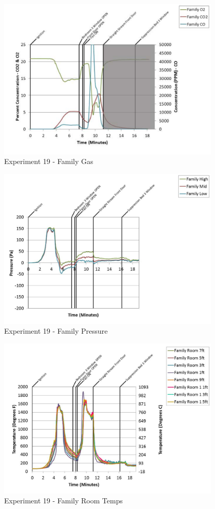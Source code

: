 \documentclass{article}
\begin{document}
\begin{appendices}
	\clearpage

	\begin{figure}[h!]
		\centering
		\includegraphics[height=3.05in]{0_Images/Results_Charts/Exp_19_Charts/FamilyGas.pdf}
		\caption{Experiment 19 - Family Gas}
	\end{figure}
 

	\begin{figure}[h!]
		\centering
		\includegraphics[height=3.05in]{0_Images/Results_Charts/Exp_19_Charts/FamilyPressure.pdf}
		\caption{Experiment 19 - Family Pressure}
	\end{figure}
 
	\clearpage

	\begin{figure}[h!]
		\centering
		\includegraphics[height=3.05in]{0_Images/Results_Charts/Exp_19_Charts/FamilyRoomTemps.pdf}
		\caption{Experiment 19 - Family Room Temps}
	\end{figure}
 


\end{appendices}
\end{document}
